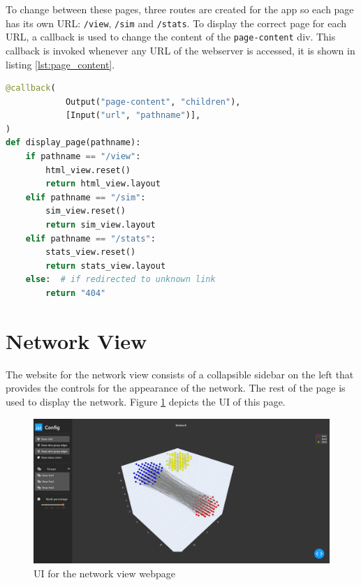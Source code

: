 To change between these pages, three routes are created for the app so each page has its own URL: \texttt{/view}, \texttt{/sim} and \texttt{/stats}. To display the correct page for each URL, a callback is used to change the content of the \texttt{page-content} div. This callback is invoked whenever any URL of the webserver is accessed, it is shown in listing \ref{lst:page_content}.
\begin{lstlisting}[language=python, caption={Create callback for page content}, label={lst:page_content}]
@callback(
            Output("page-content", "children"),
            [Input("url", "pathname")],
)
def display_page(pathname):
    if pathname == "/view":
        html_view.reset()
        return html_view.layout
    elif pathname == "/sim":
        sim_view.reset()
        return sim_view.layout
    elif pathname == "/stats":
        stats_view.reset()
        return stats_view.layout
    else:  # if redirected to unknown link
        return "404"
\end{lstlisting}

\section{Network View}
The website for the network view consists of a collapsible sidebar on the left that provides the controls for the appearance of the network. The rest of the page is used to display the network. Figure \ref{fig:web_network_view} depicts the UI of this page.

\begin{figure}
    \centering
    \includegraphics[width=0.75\linewidth]{images/web_network_view.png}
    \caption{UI for the network view webpage}
    \label{fig:web_network_view}
\end{figure}

